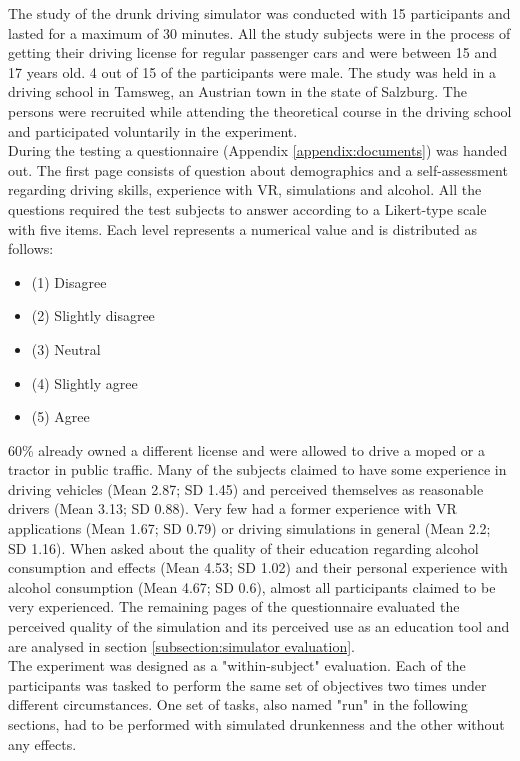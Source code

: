 The study of the drunk driving simulator was conducted with 15 participants and lasted for a maximum of 30 minutes.
All the study subjects were in the process of getting their driving license for regular passenger cars and were between 15 and 17 years old.
4 out of 15 of the participants were male.
The study was held in a driving school in Tamsweg, an Austrian town in the state of Salzburg.
The persons were recruited while attending the theoretical course in the driving school and participated voluntarily in the experiment.
\\
During the testing a questionnaire (Appendix \ref{appendix:documents}) was handed out.
The first page consists of question about demographics and a self-assessment regarding driving skills, experience with VR, simulations and alcohol.
All the questions required the test subjects to answer according to a Likert-type scale \autocite[]{likert1932technique} with five items.
Each level represents a numerical value and is distributed as follows:
\begin{itemize}
    \item (1) Disagree
    \item (2) Slightly disagree
    \item (3) Neutral
    \item (4) Slightly agree
    \item (5) Agree
\end{itemize}
60\% already owned a different license and were allowed to drive a moped or a tractor in public traffic.
Many of the subjects claimed to have some experience in driving vehicles (Mean 2.87; SD 1.45) and perceived themselves as reasonable drivers (Mean 3.13; SD 0.88).
Very few had a former experience with VR applications (Mean 1.67; SD 0.79) or driving simulations in general (Mean 2.2; SD 1.16).
When asked about the quality of their education regarding alcohol consumption and effects (Mean 4.53; SD 1.02) and their personal experience with alcohol consumption (Mean 4.67; SD 0.6), almost all participants claimed to be very experienced.
The remaining pages of the questionnaire evaluated the perceived quality of the simulation and its perceived use as an education tool and are analysed in section \ref{subsection:simulator evaluation}.
\\
The experiment was designed as a "within-subject" evaluation. \autocite[]{charness2012experimental} 
Each of the participants was tasked to perform the same set of objectives two times under different circumstances.
One set of tasks, also named "run" in the following sections, had to be performed with simulated drunkenness and the other without any effects.
